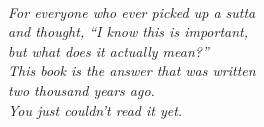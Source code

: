 \thispagestyle{empty}
~
\vspace{2.5in}

\begin{center}
\itshape
For everyone who ever picked up a sutta\\
and thought, ``I know this is important,\\
but what does it actually \emph{mean}?''\\[12pt]
This book is the answer that was written\\
two thousand years ago.\\
You just couldn't read it yet.
\end{center}

\cleardoublepage
